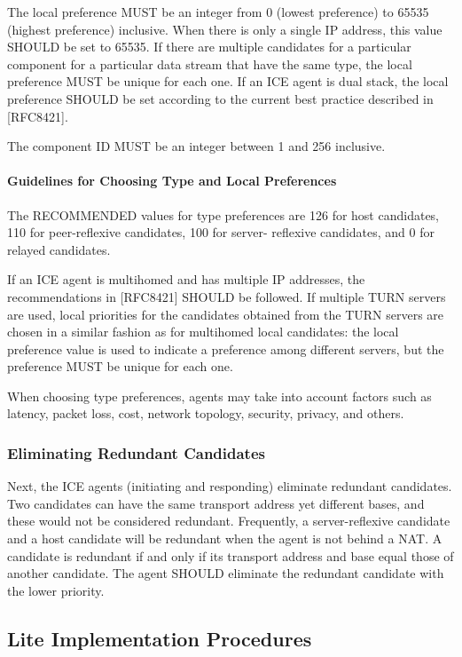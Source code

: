 \documentclass{article}
\begin{document}
The local preference MUST be an integer from 0 (lowest preference) to 65535 (highest preference) inclusive.  When there is only a single IP address, this value SHOULD be set to 65535.  If there are multiple candidates for a particular component for a particular data stream that have the same type, the local preference MUST be unique for each one.  If an ICE agent is dual stack, the local preference SHOULD be set according to the current best practice described in [RFC8421].

The component ID MUST be an integer between 1 and 256 inclusive.

\paragraph{Guidelines for Choosing Type and Local Preferences}

The RECOMMENDED values for type preferences are 126 for host candidates, 110 for peer-reflexive candidates, 100 for server- reflexive candidates, and 0 for relayed candidates.

If an ICE agent is multihomed and has multiple IP addresses, the recommendations in [RFC8421] SHOULD be followed.  If multiple TURN servers are used, local priorities for the candidates obtained from the TURN servers are chosen in a similar fashion as for multihomed local candidates: the local preference value is used to indicate a preference among different servers, but the preference MUST be unique for each one.

When choosing type preferences, agents may take into account factors such as latency, packet loss, cost, network topology, security, privacy, and others.

\subsubsection{Eliminating Redundant Candidates}

Next, the ICE agents (initiating and responding) eliminate redundant candidates.  Two candidates can have the same transport address yet different bases, and these would not be considered redundant. Frequently, a server-reflexive candidate and a host candidate will be redundant when the agent is not behind a NAT.  A candidate is redundant if and only if its transport address and base equal those of another candidate.  The agent SHOULD eliminate the redundant candidate with the lower priority.

\subsection{Lite Implementation Procedures}
\end{document}
